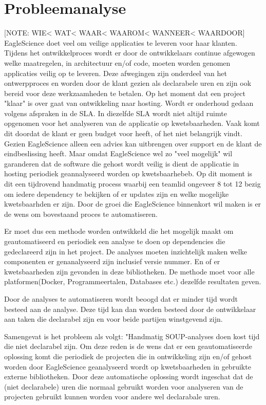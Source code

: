 \section{Probleemanalyse}\label{sec:probleemanalyse}
[NOTE: WIE< WAT< WAAR< WAAROM< WANNEER< WAARDOOR]
EagleScience doet veel om veilige applicaties te leveren voor haar klanten. Tijdens het ontwikkelproces wordt er door de ontwikkelaars continue afgewogen welke maatregelen, in architectuur en/of code, moeten worden genomen applicaties veilig op te leveren. Deze afwegingen zijn onderdeel van het ontwerpproces en worden door de klant gezien als declarabele uren en zijn ook bereid voor deze werkzaamheden te betalen. Op het moment dat een project "klaar" is over gaat van ontwikkeling naar hosting. Wordt er onderhoud gedaan volgens afspraken in de SLA. In diezelfde SLA wordt niet altijd ruimte opgenomen voor het analyseren van de applicatie op kwetsbaarheden. Vaak komt dit doordat de klant er geen budget voor heeft, of het niet belangrijk vindt. Gezien EagleScience alleen een advies kan uitbrengen over support en de klant de eindbeslissing heeft. Maar omdat EagleScience wel zo "veel mogelijk" wil garanderen dat de software die gehost wordt veilig is dient de applicatie in hosting periodiek geannalyseerd worden op kwetsbaarhebeb. Op dit moment is dit een tijdrovend handmatig process waarbij een teamlid ongeveer 8 tot 12 bezig om iedere dependency te bekijken of er updates zijn en welke mogelijke kwetsbaarhden er zijn. Door de groei die EagleScience binnenkort wil maken is er de wens om bovestaand proces te automatiseren.

Er moet dus een methode worden ontwikkeld die het mogelijk maakt om geautomatiseerd en periodiek een analyse te doen op dependencies die gedeclareerd zijn in het project. De analyses moeten inzichtelijk maken welke componenten er genanalyseerd zijn inclusief versie nummer. En of er kwetsbaarheden zijn gevonden in deze bibliotheken. De methode moet voor alle platformen(Docker, Programmeertalen, Databases etc.) dezelfde resultaten geven.

Door de analyses te automatiseren wordt beoogd dat er minder tijd wordt besteed aan de analyse. Deze tijd kan dan worden besteed door de ontwikkelaar aan taken die declarabel zijn en voor beide partijen winstgevend zijn.


Samengevat is het probleem als volgt: "Handmatig SOUP-analyses doen kost tijd die niet declarabel zijn. Om deze reden is de wens dat er een geautomatiseerde oplossing komt die periodiek de projecten die in ontwikkeling zijn en/of gehost worden door EagleScience geanalyseerd wordt op kwetsbaarheden in gebruikte externe bibliotheken. Door deze automatische oplossing wordt ingeschat dat de (niet declarabele) uren die normaal gebruikt worden voor analyseren van de projecten gebruikt kunnen worden voor andere wel declarabale uren.


